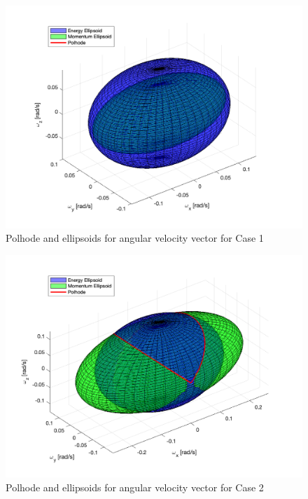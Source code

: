 \begin{figure}[H]
\centering
\includegraphics[scale=0.6]{Images/ps2_problem9_p7_x.png}
\caption{Polhode and ellipsoids for angular velocity vector for Case 1}
\label{fig:ps2_problem9_p7_x}
\end{figure}

\begin{figure}[H]
\centering
\includegraphics[scale=0.6]{Images/ps2_problem9_p7_y.png}
\caption{Polhode and ellipsoids for angular velocity vector for Case 2}
\label{fig:ps2_problem9_p7_y}
\end{figure}


